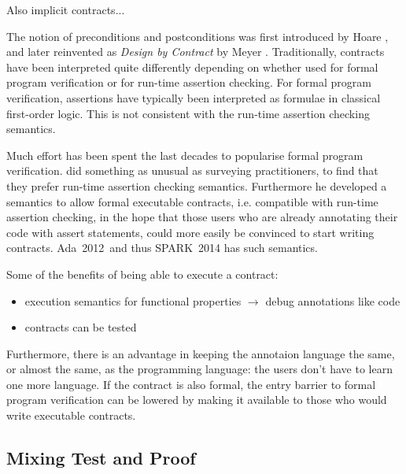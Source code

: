 \documentclass[sttt,draft]{svjour}
\newcommand{\newspark}{SPARK~2014\xspace}
\newcommand{\adatwtw}{Ada~2012\xspace}
\begin{document}
Also implicit contracts...

The notion of preconditions and postconditions was first introduced by
Hoare \cite{}, and later reinvented as \emph{Design by Contract} by
Meyer \cite{}. Traditionally, contracts have been interpreted quite
differently depending on whether used for formal program verification
or for run-time assertion checking. For formal program verification,
assertions have typically been interpreted as formulae in classical
first-order logic. This is not consistent with the run-time assertion
checking semantics.

Much effort has been spent the last decades to popularise formal
program verification. \cite{tseChalin10} did something as unusual as
surveying practitioners, to find that they prefer run-time assertion
checking semantics. Furthermore he developed a semantics to allow
formal executable contracts, i.e. compatible with run-time assertion
checking, in the hope that those users who are already annotating
their code with assert statements, could more easily be convinced to
start writing contracts. \adatwtw\ and thus \newspark has such
semantics.

Some of the benefits of being able to execute a contract:
\begin{itemize}
\item execution semantics for functional properties $\rightarrow$ debug
  annotations like code
\item contracts can be tested
\end{itemize}
Furthermore, there is an advantage in keeping the annotaion language
the same, or almost the same, as the programming language: the users
don't have to learn one more language. If the contract is also formal,
the entry barrier to formal program verification can be lowered by
making it available to those who would write executable contracts.

\subsection{Mixing Test and Proof}
\end{document}
